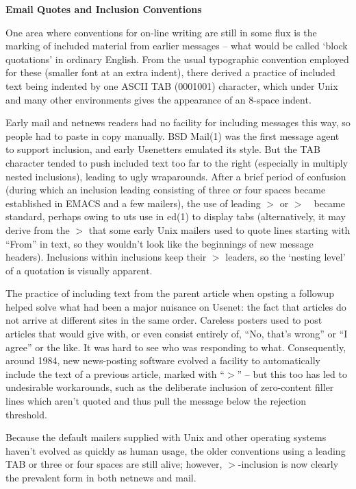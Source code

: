 \begin{center}\textbf{Email Quotes and Inclusion Conventions}\end{center}

One area where conventions for on-line writing are still in some flux is the marking of included material from earlier messages -- what
would be called `block quotations' in ordinary English. From the usual typographic convention employed for these (smaller font at an extra
indent), there derived a practice of included text being indented by one ASCII TAB (0001001) character, which under Unix and many other
environments gives the appearance of an 8-space indent.

Early mail and netnews readers had no facility for including messages this way, so people had to paste in copy manually. BSD Mail(1) was
the first message agent to support inclusion, and early Usenetters emulated its style. But the TAB character tended to push included text
too far to the right (especially in multiply nested inclusions), leading to ugly wraparounds. After a brief period of confusion (during
which an inclusion leading consisting of three or four spaces became established in EMACS and a few mailers), the use of leading $>$ or
$>$\ \ became standard, perhaps owing to uts use in ed(1) to display tabs (alternatively, it may derive from the $>$ that some early Unix
mailers used to quote lines starting with ``From'' in text, so they wouldn't look like the beginnings of new message headers). Inclusions
within inclusions keep their $>$ leaders, so the `nesting level' of a quotation is visually apparent.

The practice of including text from the parent article when opsting a followup helped solve what had been a major nuisance on Usenet: the
fact that articles do not arrive at different sites in the same order. Careless posters used to post articles that would give with, or even
consist entirely of, ``No, that's wrong'' or ``I agree'' or the like. It was hard to see who was responding to what. Consequently, around
1984, new news-posting software evolved a facility to automatically include the text of a previous article, marked with ``$>$'' -- but this
too has led to undesirable workarounds, such as the deliberate inclusion of zero-content filler lines which aren't quoted and thus pull the
message below the rejection threshold.

Because the default mailers supplied with Unix and other operating systems haven't evolved as quickly as human usage, the older conventions
using a leading TAB or three or four spaces are still alive; however, $>$-inclusion is now clearly the prevalent form in both netnews and
mail.

